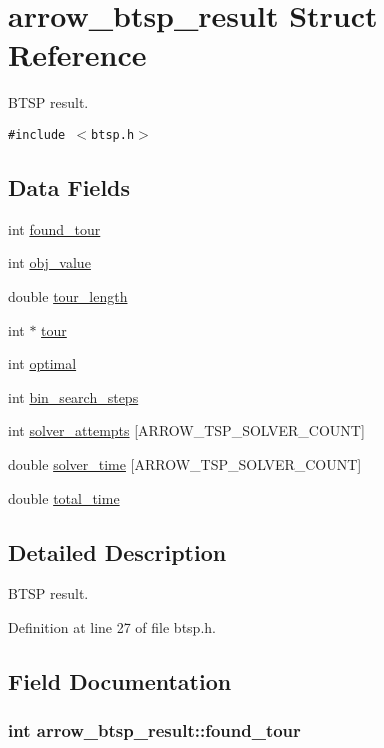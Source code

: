 \hypertarget{structarrow__btsp__result}{
\section{arrow\_\-btsp\_\-result Struct Reference}
\label{structarrow__btsp__result}
}
BTSP result.  


{\tt \#include $<$btsp.h$>$}

\subsection*{Data Fields}
\begin{CompactItemize}
\item 
int \hyperlink{structarrow__btsp__result_6ba21b4231cfe2c1e437a9f7e8f31aa6}{found\_\-tour}
\item 
int \hyperlink{structarrow__btsp__result_ea5f7f45bf61f33ca6b57829da92e041}{obj\_\-value}
\item 
double \hyperlink{structarrow__btsp__result_3c0b8827a873df71166e7fe9419c45c2}{tour\_\-length}
\item 
int $\ast$ \hyperlink{structarrow__btsp__result_ebd9a553dc3bf31f52eda0b293b0e272}{tour}
\item 
int \hyperlink{structarrow__btsp__result_febcf61e24bf277eeb7795c18bd42b8b}{optimal}
\item 
int \hyperlink{structarrow__btsp__result_80106c5f0b8f82353ad6771ad9eaac71}{bin\_\-search\_\-steps}
\item 
int \hyperlink{structarrow__btsp__result_b1d423ab6eda81de4c3bde1685976593}{solver\_\-attempts} \mbox{[}ARROW\_\-TSP\_\-SOLVER\_\-COUNT\mbox{]}
\item 
double \hyperlink{structarrow__btsp__result_f13227603570821a0ba7d6466f39f00c}{solver\_\-time} \mbox{[}ARROW\_\-TSP\_\-SOLVER\_\-COUNT\mbox{]}
\item 
double \hyperlink{structarrow__btsp__result_dea5711f0a574d98f66d1b20011a68de}{total\_\-time}
\end{CompactItemize}


\subsection{Detailed Description}
BTSP result. 

Definition at line 27 of file btsp.h.

\subsection{Field Documentation}
\hypertarget{structarrow__btsp__result_6ba21b4231cfe2c1e437a9f7e8f31aa6}{
\subsubsection{\setlength{\rightskip}{0pt plus 5cm}int {\bf arrow\_\-btsp\_\-result::found\_\-tour}}}
\label{structarrow__btsp__result_6ba21b4231cfe2c1e437a9f7e8f31aa6}


